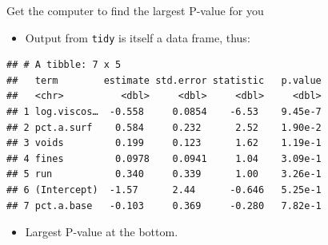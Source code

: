 \documentclass[
  ignorenonframetext,
]{beamer}
\newenvironment{Shaded}{\begin{snugshade}}{\end{snugshade}}
\newcommand{\FloatTok}[1]{\textcolor[rgb]{0.00,0.00,0.81}{#1}}
\newcommand{\KeywordTok}[1]{\textcolor[rgb]{0.13,0.29,0.53}{\textbf{#1}}}
\newcommand{\NormalTok}[1]{#1}
\newcommand{\OperatorTok}[1]{\textcolor[rgb]{0.81,0.36,0.00}{\textbf{#1}}}
\newcommand{\StringTok}[1]{\textcolor[rgb]{0.31,0.60,0.02}{#1}}
\providecommand{\tightlist}{%
  \setlength{\itemsep}{0pt}\setlength{\parskip}{0pt}}
\begin{document}
\begin{frame}[fragile]{Get the computer to find the largest P-value for
you}
\protect\hypertarget{get-the-computer-to-find-the-largest-p-value-for-you}{}

\begin{itemize}
\tightlist
\item
  Output from \texttt{tidy} is itself a data frame, thus:
\end{itemize}

\begin{Shaded}
\end{Shaded}

\begin{verbatim}
## # A tibble: 7 x 5
##   term        estimate std.error statistic   p.value
##   <chr>          <dbl>     <dbl>     <dbl>     <dbl>
## 1 log.viscos…  -0.558     0.0854    -6.53    9.45e-7
## 2 pct.a.surf    0.584     0.232      2.52    1.90e-2
## 3 voids         0.199     0.123      1.62    1.19e-1
## 4 fines         0.0978    0.0941     1.04    3.09e-1
## 5 run           0.340     0.339      1.00    3.26e-1
## 6 (Intercept)  -1.57      2.44      -0.646   5.25e-1
## 7 pct.a.base   -0.103     0.369     -0.280   7.82e-1
\end{verbatim}

\begin{itemize}
\tightlist
\item
  Largest P-value at the bottom.
\end{itemize}

\end{frame}
\end{document}
